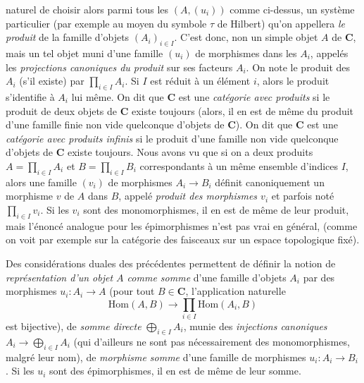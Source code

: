 
\noindent naturel de choisir alors parmi tous les $(A,(u_i))$ comme ci-dessus,
un système particulier (par exemple au moyen du symbole $\tau$ de Hilbert)
qu'on appellera \textit{le produit} de la famille d'objets $(A_i)_{i\in I}$.
C'est donc, non un simple objet $A$ de $\mathbf{C}$, mais un tel objet muni d'une
famille $(u_i)$ de morphismes dans les $A_i$, appelés les
\textit{projections canoniques du produit} sur ses facteurs $A_i$. On note le
produit des $A_i$ (s'il existe) par $\displaystyle\prod_{i\in I}A_i$. Si $I$ est réduit à
un élément $i$, alors le produit s'identifie à $A_i$ lui même. On dit que $\mathbf{C}$
est une \textit{catégorie avec produits} si le produit de deux objets de $\mathbf{C}$
existe toujours (alors, il en est de même du produit d'une famille finie non
vide quelconque d'objets de $\mathbf{C}$). On dit que $\mathbf{C}$ est une \textit{catégorie
avec produits infinis} si le produit d'une famille non vide quelconque d'objets
de $\mathbf{C}$ existe toujours. Nous avons vu que si on a deux produits
$A=\displaystyle\prod_{i\in I}A_i$ et $B=\displaystyle\prod_{i\in I}B_i$ correspondants à un même
ensemble d'indices $I$, alors une famille $(v_i)$ de morphismes
$A_i\to B_i$ définit canoniquement un morphisme $v$ de $A$ dans
$B$, appelé \textit{produit des morphismes $v_i$} et parfois noté
$\displaystyle\prod_{i\in I}v_i$. Si les $v_i$ sont des monomorphismes, il en est de même
de leur produit, mais l'énoncé analogue pour les épimorphismes n'est pas vrai
en général, (comme on voit par exemple sur la catégorie des faisceaux sur un
espace topologique fixé).

Des considérations duales des précédentes permettent de définir la notion de
\textit{représentation d'un objet $A$ comme somme} d'une famille d'objets $A_i$
par des morphismes $u_i:A_i\to A$ (pour tout $B\in \mathbf{C}$,
l'application naturelle
\[
  \mathrm{Hom}(A,B)\to
  \prod_{i\in I}\mathrm{Hom}(A_i,B)
\]
est bijective), de \textit{somme directe} $\displaystyle\bigoplus_{i\in I}A_i$, munie des
\textit{injections canoniques} $A_i\to\displaystyle\bigoplus_{i\in I}A_i$ (qui
d'ailleurs ne sont pas nécessairement des monomorphismes, malgré leur nom), de
\textit{morphisme somme} d'une famille de morphismes
$u_i:A_i\to B_i$. Si les $u_i$ sont des épimorphismes, il en est de
même de leur somme.

